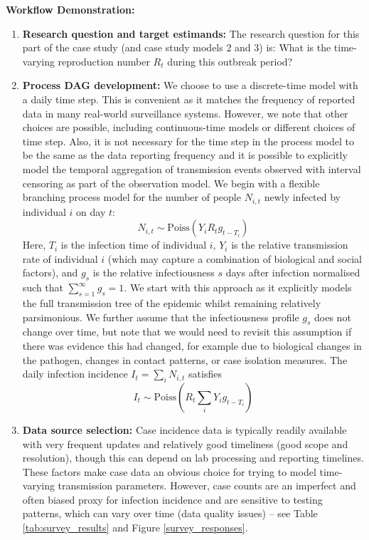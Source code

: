 \documentclass{article}
\begin{document}
\textbf{Workflow Demonstration:}
\begin{enumerate}
    \item \textbf{Research question and target estimands:} The research question for this part of the case study (and case study models 2 and 3) is: What is the time-varying reproduction number $R_t$ during this outbreak period?

    \item \textbf{Process DAG development:} We choose to use a discrete-time model with a daily time step. This is convenient as it matches the frequency of reported data in many real-world surveillance systems. However, we note that other choices are possible, including continuous-time models or different choices of time step. Also, it is not necessary for the time step in the process model to be the same as the data reporting frequency and it is possible to explicitly model the temporal aggregation of transmission events observed with interval censoring as part of the observation model. We begin with a flexible branching process model for the number of people $N_{i,t}$ newly infected by individual $i$ on day $t$:
    \begin{equation} \label{eq:individual_level}
         N_{i,t} \sim \mathrm{Poiss} \left( Y_i R_t g_{t-T_i} \right)
    \end{equation} 
    Here, $T_i$ is the infection time of individual $i$, $Y_i$ is the relative transmission rate of individual $i$ (which may capture a combination of biological and social factors), and $g_s$ is the relative infectiousness $s$ days after infection normalised such that $\sum_{s=1}^\infty g_s=1$. We start with this approach as it explicitly models the full transmission tree of the epidemic whilst remaining relatively parsimonious. We further assume that the infectiousness profile $g_s$ does not change over time, but note that we would need to revisit this assumption if there was evidence this had changed, for example due to biological changes in the pathogen, changes in contact patterns, or case isolation measures. The daily infection incidence $I_t=\sum_i N_{i,t}$ satisfies
    \begin{equation} \label{eq:It_with_hetergoeneity}
        I_t \sim \mathrm{Poiss}\left( R_t \sum_i Y_i g_{t-T_i} \right)
    \end{equation}


\item \textbf{Data source selection:} Case incidence data is typically readily available with very frequent updates and relatively good timeliness (good scope and resolution), though this can depend on lab processing and reporting timelines. These factors make case data an obvious choice for trying to model time-varying transmission parameters. However, case counts are an imperfect and often biased proxy for infection incidence and are sensitive to testing patterns, which can vary over time (data quality issues) -- see Table \ref{tab:survey_results} and Figure \ref{survey_responses}. 



\end{enumerate}
\end{document}
